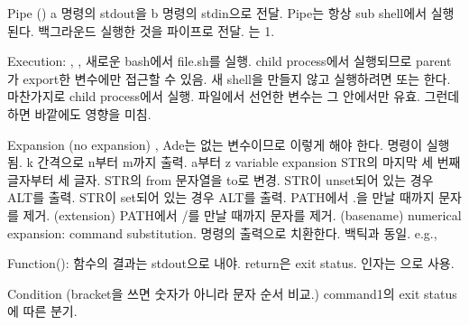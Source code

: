   \itm Pipe () a 명령의 stdout을 b 명령의 stdin으로 전달.
  \bitmz
    \itm Pipe는 항상 sub shell에서 실행된다.
    \itm \code{|\&} \rarr 백그라운드 실행한 것을 파이프로 전달. 는 1.
  \eitmz

  \itm Execution: , , 
  \bitmz
    \itm {} 새로운 bash에서 file.sh를 실행. child process에서 실행되므로 parent가 export한 변수에만 접근할 수 있음.
    \itm 새 shell을 만들지 않고 실행하려면  또는 한다. 마찬가지로 child process에서 실행.
    \itm 파일에서 선언한 변수는 그 안에서만 유효. 그런데 하면 바깥에도 영향을 미침.
  \eitmz

  \itm Expansion
  \bitmz
    \itm {} \rarr {}
    \itm {} \rarr {} (no expansion)
    \itm {} \rarr {}, Ade는 없는 변수이므로  이렇게 해야 한다.
    \itm {} \rarr {} 명령이 실행됨.
    \itm {} \rarr {}
    \itm {} k 간격으로 n부터 m까지 출력.
    \bitmz
      \itm {} \rarr {}
      \itm {} \rarr {}
      \itm {} \rarr {}
      \itm {} \rarr a부터 z
    \eitmz
    \itm \code{\$\{ \}} variable expansion
    \bitmz
      \itm {} \rarr STR의 마지막 세 번째 글자부터 세 글자.
      \itm {} \rarr STR의 from 문자열을 to로 변경.
      \itm {} \rarr STR이 unset되어 있는 경우 ALT를 출력.
      \itm {} \rarr STR이 set되어 있는 경우 ALT를 출력.
      \itm {} \rarr PATH에서 .을 만날 때까지 문자를 제거. (extension)
      \itm {} \rarr PATH에서 /를 만날 때까지 문자를 제거. (basename)
    \eitmz
    \itm \code{\$(( ))} numerical expansion:  
    \itm \code{\$( )} command substitution. 명령의 출력으로 치환한다. 백틱과 동일. e.g., 
  \eitmz


  \itm Function(): 함수의 결과는 stdout으로 내야. return은 exit status. 인자는 으로 사용.

  \itm Condition
  \bitmz
    \itm {}
    \itm {}
    \itm {}
    \itm {} (bracket을 쓰면 숫자가 아니라 문자 순서 비교.)
    \itm {} \rarr command1의 exit status에 따른 분기.
  \eitmz


